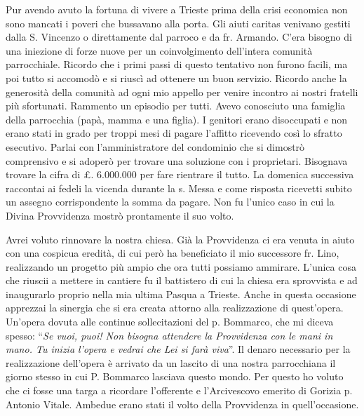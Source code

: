 Pur avendo avuto la fortuna di vivere a Trieste prima della crisi economica non sono mancati i 
poveri che bussavano alla porta. Gli aiuti caritas venivano gestiti dalla S. Vincenzo o 
direttamente dal parroco e da fr. Armando. C’era bisogno di una iniezione di forze nuove per un 
coinvolgimento dell’intera comunità parrocchiale. Ricordo che i primi passi di questo tentativo 
non furono facili, ma poi tutto si accomodò e si riuscì ad ottenere un buon servizio. Ricordo 
anche la generosità della comunità ad ogni mio appello per venire incontro ai nostri fratelli più 
sfortunati. Rammento un episodio per tutti. Avevo conosciuto una famiglia della parrocchia 
(papà, mamma e una figlia). I genitori erano disoccupati e non erano stati in grado per troppi 
mesi di pagare l’affitto ricevendo così lo sfratto esecutivo. Parlai con l’amministratore del 
condominio che si dimostrò comprensivo e si adoperò per trovare una soluzione con i proprietari. 
Bisognava trovare la cifra di £. 6.000.000 per fare rientrare il tutto. La domenica successiva 
raccontai ai fedeli la vicenda durante la s. Messa e come risposta ricevetti subito un assegno 
corrispondente la somma da pagare. Non fu l’unico caso in cui la Divina Provvidenza mostrò 
prontamente il suo volto.

Avrei voluto rinnovare la nostra chiesa. Già la Provvidenza ci era venuta in aiuto con una 
cospicua eredità, di cui però ha beneficiato il mio successore fr. Lino, realizzando un progetto 
più ampio che ora tutti possiamo ammirare. L’unica cosa che riuscii a mettere in cantiere fu il 
battistero di cui la chiesa era sprovvista e ad inaugurarlo proprio nella mia ultima Pasqua a 
Trieste. Anche in questa occasione apprezzai la sinergia che si era creata attorno alla 
realizzazione di quest’opera. Un’opera dovuta alle continue sollecitazioni del p. Bommarco, che 
mi diceva spesso: “\textit{Se vuoi, puoi! Non bisogna attendere la Provvidenza con le mani in mano.
Tu inizia l’opera e vedrai che Lei si farà viva}”. Il denaro necessario per la realizzazione
dell’opera è arrivato da un lascito di una nostra parrocchiana il giorno stesso in cui P. Bommarco 
lasciava questo mondo. Per questo ho voluto che ci fosse una targa a ricordare l’offerente e 
l’Arcivescovo emerito di Gorizia p. Antonio Vitale. Ambedue erano stati il volto della 
Provvidenza in quell’occasione.
\enlargethispage{-\baselineskip}

